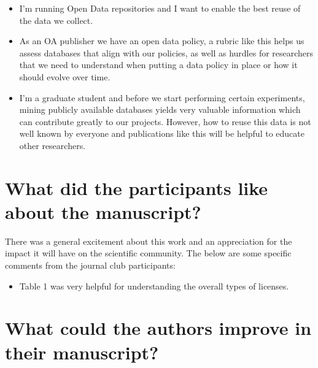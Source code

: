 \documentclass[10pt]{article}
\providecommand{\tightlist}{\setlength{\itemsep}{0pt}\setlength{\parskip}{0pt}}%
\begin{document}
\begin{itemize}
\tightlist
\item
  I'm running Open Data repositories and I want to enable the best reuse
  of the data we collect.
\end{itemize}

\begin{itemize}
\tightlist
\item
  As an OA publisher we have an open data policy, a rubric like this
  helps us assess databases that align with our policies, as well as
  hurdles for researchers that we need to understand when putting a data
  policy in place or how it should evolve over time.
\end{itemize}

\begin{itemize}
\tightlist
\item
  I'm a graduate student and before we start performing certain
  experiments, mining publicly available databases yields very valuable
  information which can contribute greatly to our projects. However, how
  to reuse this data is not well known by everyone and publications like
  this will be helpful to educate other researchers.~
\end{itemize}

\par\null

\section*{What did the participants like about the
manuscript?}

{\label{710649}}\par\null

There was a general excitement about this work and an appreciation for
the impact it will have on the scientific community. The below are some
specific comments from the journal club participants:

\par\null

\begin{itemize}
\tightlist
\item
  Table 1 was very helpful for understanding the overall types of
  licenses.
\end{itemize}

\par\null\par\null

\section*{What could the authors improve in their
manuscript?}
\end{document}
